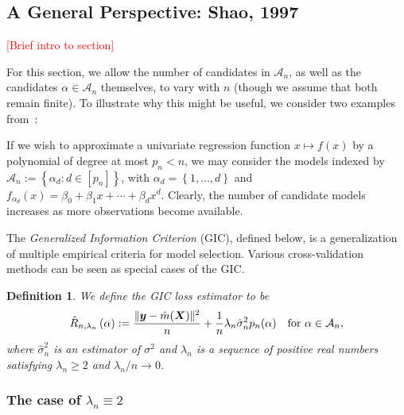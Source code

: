 \documentclass[12pt, letter paper]{article}
\newcommand{\1}{\mathmybb{1}}
\newtheorem{definition}{Definition}[section]
\newcommand{\0}{\emptyset}
\newcommand{\paren}[1]{\left(#1 \right)}
\newcommand{\set}[1]{\left\{ #1 \right\}}
\newcommand{\norm}[1]{|\hspace{-1pt}|#1 |\hspace{-1pt}|}
\newcommand{\normsq}[1]{\norm{#1}^{2}}
\newcommand{\Acal}{\mathcal{A}_{n}}
\newcommand{\Tcal}{\mathcal{T}_{n}}
\newcommand{\X}{\boldsymbol{X}}
\newcommand{\y}{\boldsymbol{y}}
\newcommand{\Rhat}[2]{\hat{R}_{n, #1}\paren{#2}}
\newcommand{\sigmahat}{\hat{\sigma}^{2}_{n}}
\begin{document}
\subsection{A General Perspective: Shao, 1997}
\renewcommand{\Acal}{\mathcal{A}_{n}}
\renewcommand{\Tcal}{\mathcal{T}_{n}}

\textcolor{red}{[Brief intro to section]}


For this section, we allow the number of candidates in \(\Acal\), as well as the candidates \(\alpha\in\Acal\) themselves, to vary with \(n\) (though we assume that both remain finite). To illustrate why this might be useful, we consider two examples from~\cite{shao_1997}:

If we wish to approximate a univariate regression function \(x\mapsto f(x)\) by a polynomial of degree at most \(p_{n}< n\), we may consider the models indexed by \(\Acal:=\set{\alpha_{d}:d\in[p_n]}\), with \(\alpha_{d} = \set{1,\ldots,d}\) and \(f_{\alpha_{d}}(x) = \beta_{0} + \beta_{1}x + \cdots + \beta_{d}x^{d}\). Clearly, the number of candidate models increases as more observations become available.

The \emph{Generalized Information Criterion} (GIC), defined below, is a generalization of multiple empirical criteria for model selection. Various cross-validation methods can be seen as special cases of the GIC.

\begin{definition}
    We define the GIC loss estimator to be
    \[\Rhat{\lambda_{n}}{\alpha} := \frac{\normsq{\y - \hat{m}(\X)}}{n} + \frac{1}{n}\lambda_{n}\sigmahat p_{n}(\alpha)\quad\text{for }\alpha\in\Acal,\]
    where \(\sigmahat\) is an estimator of \(\sigma^{2}\) and \(\lambda_{n}\) is a sequence of positive real numbers satisfying \(\lambda_{n}\geq 2\) and \(\lambda_{n}/n\to 0\).
\end{definition}

\subsubsection{The case of \(\lambda_{n} \equiv 2\)}
\end{document}

